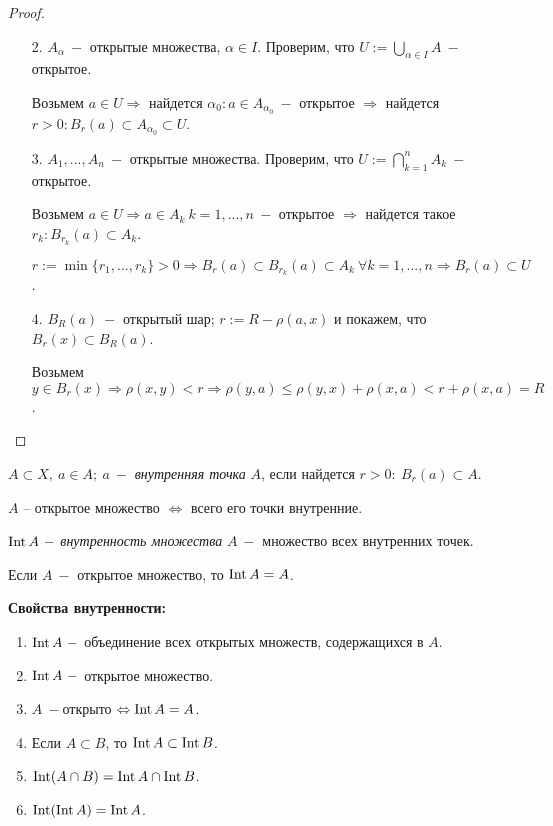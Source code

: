 \begin{proof}
    \begin{enumerate}
        \item[]
        \item[2.] $A_\alpha\ -$ открытые множества, $\alpha\in I$. Проверим, что $U:=\bigcup\limits_{\alpha\in I}A\ -$ открытое.

        Возьмем $a\in U\Rightarrow$ найдется $\alpha_0:a\in A_{\alpha_0}\ -$ открытое $\Rightarrow $ найдется $r>0:B_r(a)\subset A_{\alpha_0} \subset U$.

        \item[3.] $A_1, ..., A_n\ -$ открытые множества. Проверим, что $U:=\bigcap\limits_{k=1}^n A_k\ -$ открытое.

        Возьмем $a\in U\Rightarrow a\in A_k\ k=1, ..., n\ -$ открытое $\Rightarrow $ найдется такое $r_k:B_{r_k}(a)\subset A_k$.

        $r:=\min\{r_1, ..., r_k\}>0\Rightarrow B_r(a)\subset B_{r_k}(a)\subset A_k\ \forall k =1, ..., n\Rightarrow B_r(a)\subset U$.

        \item[4.] $B_R(a)\ -$ открытый шар; $r:=R-\rho(a, x)$ и покажем, что $B_r(x)\subset B_R(a)$.

        Возьмем $y\in B_r(x)\Rightarrow \rho(x, y)<r\Rightarrow \rho(y, a)\leq \rho(y, x)+\rho(x, a)<r+\rho(x, a)=R$.
    \end{enumerate}
\end{proof}

\begin{definition}
    $A\subset X,\ a\in A;\ a\ -$ \textit{внутренняя точка} $A$, если найдется $r>0:\ B_r(a)\subset A$.
\end{definition}

\begin{remark}
    $A$ – открытое множество $\Leftrightarrow$ всего его точки внутренние.
\end{remark}

\begin{definition}
    $\operatorname{Int} A\ -$ \textit{внутренность множества} $A\ -$ множество всех внутренних точек.     
\end{definition}

\begin{remark}
    Если $A\ -$ открытое множество, то $\operatorname{Int} A=A$.
\end{remark}


\begin{statement}
    \textbf{Свойства внутренности:}
    \begin{enumerate}
        \item $\operatorname{Int} A\ -$ объединение всех открытых множеств, содержащихся в $A$.
        \item $\operatorname{Int} A\ -$ открытое множество.
        \item $A\ -$открыто $\Leftrightarrow \operatorname{Int} A=A$.
        \item Если $A\subset B$, то $\operatorname{Int} A\subset \operatorname{Int} B$.
        \item $\operatorname{Int} (A\cap B)=\operatorname{Int} A\cap \operatorname{Int} B$.
        \item $\operatorname{Int} (\operatorname{Int} A)=\operatorname{Int} A$.
    \end{enumerate}
\end{statement}


